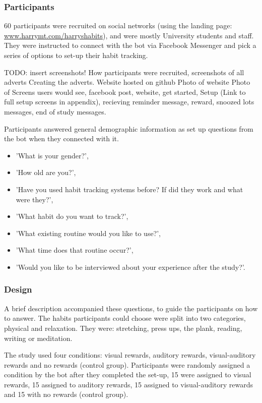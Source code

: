 \subsubsection{Participants}
60 participants were recruited on social networks (using the landing page: \url{www.harrymt.com/harryshabits}), and were mostly University students and staff. They were instructed to connect with the bot via Facebook Messenger and pick a series of options to set-up their habit tracking.

TODO: insert screenshots! How participants were recruited, screenshots of all adverts\newline
Creating the adverts. Website hosted on github\newline
Photo of website\newline
Photo of Screens users would see, facebook post, website, get started, Setup (Link to full setup screens in appendix), recieving reminder message, reward, snoozed lots messages, end of study messages.\newline


Participants answered general demographic information as set up questions from the bot when they connected with it.

\begin{itemize}
  \item 'What is your gender?',
    \item 'How old are you?',
    \item 'Have you used habit tracking systems before? If did they work and what were they?',
    \item 'What habit do you want to track?',
    \item 'What existing routine would you like to use?',
    \item 'What time does that routine occur?',
    \item 'Would you like to be interviewed about your experience after the study?'.
\end{itemize}

\subsubsection{Design}
A brief description accompanied these questions, to guide the participants on how to answer. The habits participants could choose were split into two categories, physical and relaxation. They were: stretching, press ups, the plank, reading, writing or meditation.

The study used four conditions: visual rewards, auditory rewards, visual-auditory rewards and no rewards (control group). Participants were randomly assigned a condition by the bot after they completed the set-up, 15 were assigned to visual rewards, 15 assigned to auditory rewards, 15 assigned to visual-auditory rewards and 15 with no rewards (control group).

